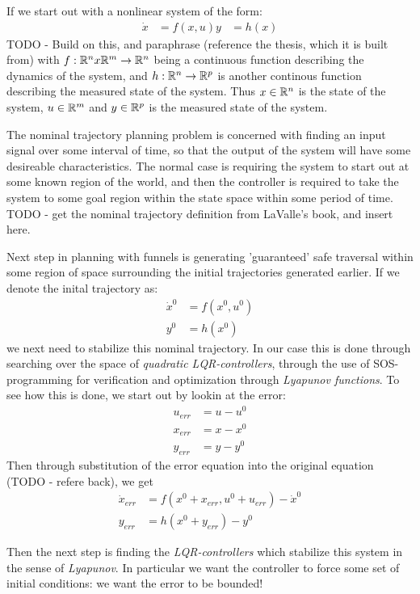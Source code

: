 If we start out with a nonlinear system of the form:
\begin{align}
  \dot{x} &= f(x,u)
        y &= h(x)
\end{align} 
TODO - Build on this, and paraphrase (reference the thesis, which it is built from)
with \(f:\mathbb{R}^nx\mathbb{R}^m \rightarrow \mathbb{R}^n\) being a continuous function describing the
dynamics of the system, and \(h:\mathbb{R}^n \rightarrow \mathbb{R}^p\) is another continous
function describing the measured state of the system. Thus \(x \in \mathbb{R}^n\) is the
state of the system, \(u\in\mathbb{R}^m\) and \(y\in\mathbb{R}^p\) is the measured state of the system.

The nominal trajectory planning problem is concerned with finding an input
signal over some interval of time, so that the output of the system will have
some desireable characteristics. The normal case is requiring the system to
start out at some known region of the world, and then the controller is required
to take the system to some goal region within the state space within some period
of time. 
TODO - get the nominal trajectory definition from LaValle's book, and insert here.

Next step in planning with funnels is generating 'guaranteed' safe traversal
within some region of space surrounding the initial trajectories generated
earlier. If we denote the inital trajectory as:
\begin{align}
  \dot{x}^0 &= f(x^0,u^0) \\
  y^0 &= h(x^0)
\end{align}
we next need to stabilize this nominal trajectory. In our case this is done
through searching over the space of \textit{quadratic LQR-controllers}, through
the use of SOS-programming for verification and optimization through
\textit{Lyapunov functions}. To see how this is done, we start out by lookin at
the error:
\begin{align}
  u_{err} &= u - u^0 \\
  x_{err} &= x - x^0 \\
  y_{err} &= y - y^0
\end{align} 
Then through substitution of the error equation into the original equation (TODO
- refere back), we get
\begin{align}
  \dot{x}_{err} &= f(x^0 + x_{err}, u^0 + u_{err}) - \dot{x}^0 \\
  y_{err} &= h(x^0 + y_{err}) - y^0
\end{align}

Then the next step is finding the \textit{LQR-controllers} which stabilize this
system in the sense of \textit{Lyapunov}. In particular we want the controller
to force some set of initial conditions:
we want the error to be bounded!

